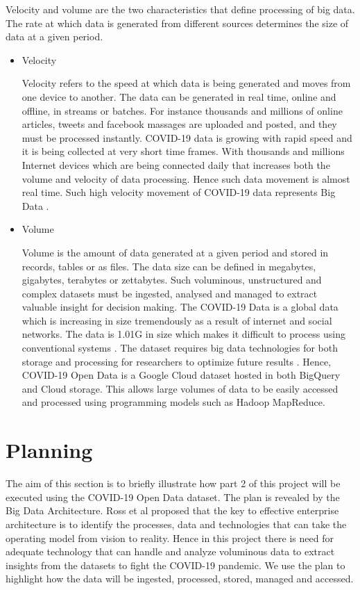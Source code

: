 \documentclass[12pt,letterpaper, twoside]{article}
\begin{document}
Velocity and volume are the two characteristics that define processing of big data.  The rate at which data is generated from different sources determines the size of data at a given period. 
\begin{itemize}

    \item Velocity
    
    	Velocity refers to the speed at which data is being generated and moves from one device to another\cite{Johnson et al}. The data can be generated in real time, online and offline, in streams or batches. For instance thousands and millions of online articles, tweets and facebook massages are uploaded and posted, and they must be processed instantly. COVID-19 data is growing with rapid speed and it is being collected at very short time frames. With thousands and millions Internet devices which are being connected daily that increases both the volume and velocity of data processing. Hence such data movement is almost real time. Such high velocity movement of COVID-19 data represents Big Data \cite{Johnson et al}.
    	
    	\item Volume
    	
    	Volume is the amount of data generated at a given period and stored in records, tables or as files\cite{Owais}. The data size can be defined in megabytes, gigabytes, terabytes or zettabytes.   Such voluminous, unstructured and complex datasets must be ingested, analysed and managed to extract valuable insight for decision making. The COVID-19 Data is a global data which is increasing in size tremendously as a result of internet  and social networks. The data is 1.01G in size which makes it difficult to process using conventional systems \cite{Patel et al}. The dataset requires big data technologies for both storage and processing for researchers to optimize future results \cite{Owais}. Hence, COVID-19 Open Data is a Google Cloud dataset hosted in both BigQuery and Cloud storage. This allows large volumes of data to be easily accessed and processed using  programming models such as Hadoop MapReduce.
    	
\end{itemize}

\section{Planning}
The aim of this section is to briefly illustrate how part 2 of this project will be executed using the COVID-19 Open Data dataset. The plan is revealed by the Big Data Architecture. Ross et al \cite{Ross} proposed that the key to effective enterprise architecture is to identify the processes, data and technologies that can take the operating model from vision to reality. Hence in this project there is need for adequate technology that can handle and analyze voluminous data to extract insights  from the datasets to fight the COVID-19 pandemic. We use the plan to highlight how the data will be ingested, processed, stored, managed and accessed.
\end{document}
